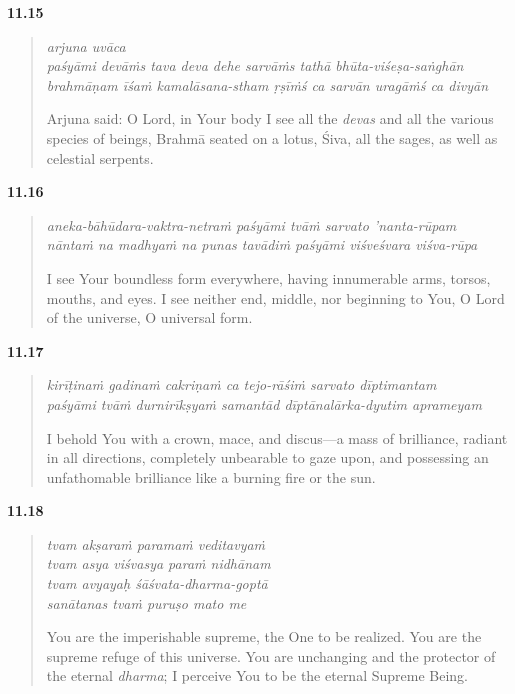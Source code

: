 \par\noindent\textbf{11.15}\par
\begin{verse}
\textit{arjuna uvāca} \\
\textit{paśyāmi devāṁs tava deva dehe sarvāṁs tathā bhūta-viśeṣa-saṅghān} \\
\textit{brahmāṇam īśaṁ kamalāsana-stham ṛṣīṁś ca sarvān uragāṁś ca divyān}

\noindent Arjuna said: O Lord, in Your body I see all the \textit{devas} and all the various species of beings, Brahmā seated on a lotus, Śiva, all the sages, as well as celestial serpents.
\end{verse}
\par



\par\noindent\textbf{11.16}\par
\begin{verse}
\textit{aneka-bāhūdara-vaktra-netraṁ paśyāmi tvāṁ sarvato ’nanta-rūpam} \\
\textit{nāntaṁ na madhyaṁ na punas tavādiṁ paśyāmi viśveśvara viśva-rūpa}

\noindent I see Your boundless form everywhere, having innumerable arms, torsos, mouths, and eyes. I see neither end, middle, nor beginning to You, O Lord of the universe, O universal form.
\end{verse}
\par



\par\noindent\textbf{11.17}\par
\begin{verse}
\textit{kirīṭinaṁ gadinaṁ cakriṇaṁ ca tejo-rāśiṁ sarvato dīptimantam} \\
\textit{paśyāmi tvāṁ durnirīkṣyaṁ samantād dīptānalārka-dyutim aprameyam}

\noindent I behold You with a crown, mace, and discus---a mass of brilliance, radiant in all directions, completely unbearable to gaze upon, and possessing an unfathomable brilliance like a burning fire or the sun.
\end{verse}
\par



\par\noindent\textbf{11.18}\par
\begin{verse}
\textit{tvam akṣaraṁ paramaṁ veditavyaṁ} \\
\textit{tvam asya viśvasya paraṁ nidhānam} \\
\textit{tvam avyayaḥ śāśvata-dharma-goptā} \\
\textit{sanātanas tvaṁ puruṣo mato me}

\noindent You are the imperishable supreme, the One to be realized. You are the supreme refuge of this universe. You are unchanging and the protector of the eternal \textit{dharma}; I perceive You to be the eternal Supreme Being.
\end{verse}
\par



